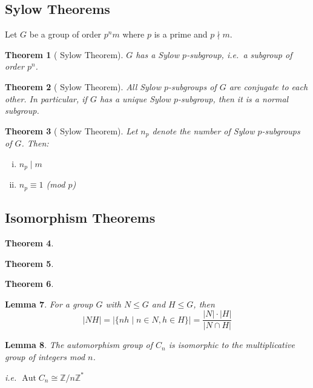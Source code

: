 \documentclass[a4paper, oneside, 12pt, final]{article}
\newtheorem{theorem}{Theorem}[section]
\newtheorem{lemma}[theorem]{Lemma}
\theoremstyle{definition}
\DeclareMathOperator{\Aut}{Aut}
\newcommand{\Z}{\mathbb{Z}}
\newcommand{\Zn}[1]{\Z/#1\Z}
\begin{document}
\subsection{Sylow Theorems}
Let \(G\) be a group of order \(p^n m\) where \(p\) is a prime and \(p\nmid m\).
\begin{theorem}[ Sylow Theorem]\label{thm:sylow1}
    \(G\) has a Sylow \(p\)-subgroup, i.e.\ a subgroup of order \(p^n\).
\end{theorem}
\begin{theorem}[ Sylow Theorem]\label{thm:sylow2}
    All Sylow \(p\)-subgroups of \(G\) are conjugate to each other.
    In particular, if \(G\) has a unique Sylow \(p\)-subgroup, then it is a normal subgroup.
\end{theorem}
\begin{theorem}[ Sylow Theorem]\label{thm:sylow3}
    Let \(n_p\) denote the number of Sylow \(p\)-subgroups of \(G\).
    Then:
    \begin{enumerate}[(i)]
        \item \(n_p \mid m\)
        \item \(n_p\equiv 1\) (mod \(p\))
    \end{enumerate}
\end{theorem}

\subsection{Isomorphism Theorems}
\begin{theorem}\label{thm:iso1}
\end{theorem}

\begin{theorem}\label{thm:iso2}
\end{theorem}

\begin{theorem}\label{thm:iso3}
\end{theorem}

\begin{lemma}\label{lem:setprodorder}
    For a group \(G\) with \(N \leqslant G\) and \(H \leqslant G\), then
    \[|NH| = |\{nh \mid n \in N, h \in H\}| = \frac{|N| \cdot |H|}{|N \cap H|}\]
\end{lemma}

\begin{lemma}\label{lem:aut}
    The automorphism group of \(C_n\) is isomorphic to the multiplicative group
    of integers mod \(n\).

    i.e. \(\Aut{C_n} \cong \Zn{n}^*\)
\end{lemma}
\end{document}
